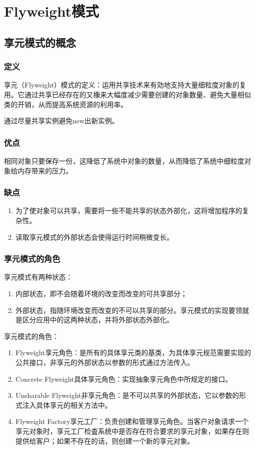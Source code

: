 \chapter{Flyweight模式}
\section{享元模式的概念}
\subsection{定义}
享元（Flyweight）模式的定义：运用共享技术来有効地支持大量细粒度对象的复用。它通过共享已经存在的又橡来大幅度减少需要创建的对象数量、避免大量相似类的开销，从而提高系统资源的利用率。
\par 通过尽量共享实例避免new出新实例。
\subsection{优点}
相同对象只要保存一份，这降低了系统中对象的数量，从而降低了系统中细粒度对象给内存带来的压力。
\subsection{缺点}
\begin{enumerate}
	\item 为了使对象可以共享，需要将一些不能共享的状态外部化，这将增加程序的复杂性。
	\item 读取享元模式的外部状态会使得运行时间稍微变长。
\end{enumerate}
\subsection{享元模式的角色}
享元模式有两种状态：
\begin{enumerate}
	\item 内部状态，即不会随着环境的改变而改变的可共享部分；
	\item 外部状态，指随环境改变而改变的不可以共享的部分。享元模式的实现要领就是区分应用中的这两种状态，并将外部状态外部化。
\end{enumerate}
享元模式的角色：
\begin{enumerate}
	\item Flyweight享元角色：是所有的具体享元类的基类，为具体享元规范需要实现的公共接口，非享元的外部状态以参数的形式通过方法传入。
	\item Concrete Flyweight具体享元角色：实现抽象享元角色中所规定的接口。
	\item Unsharable Flyweight非享元角色：是不可以共享的外部状态，它以参数的形式注入具体享元的相关方法中。
	\item Flyweight Factory享元工厂：负责创建和管理享元角色。当客户对象请求一个享元对象时，享元工厂检査系统中是否存在符合要求的享元对象，如果存在则提供给客户；如果不存在的话，则创建一个新的享元对象。
\end{enumerate}
